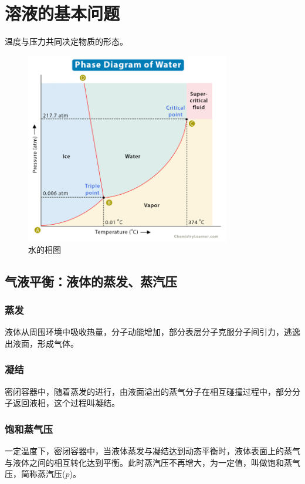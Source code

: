 \documentclass[12pt, a4paper, oneside]{ctexbook}
\begin{document}
\section{溶液的基本问题}
温度与压力共同决定物质的形态。\\
\begin{figure}[htbp]
    \centering
    \includegraphics[width=0.8\textwidth]{pics/phase_diagram.jpg}
    \caption{水的相图}
\end{figure}
\subsection{气液平衡：液体的蒸发、蒸汽压}
\subsubsection{蒸发}
液体从周围环境中吸收热量，分子动能增加，部分表层分子克服分子间引力，逃逸出液面，形成气体。\\
\subsubsection{凝结}
密闭容器中，随着蒸发的进行，由液面溢出的蒸气分子在相互碰撞过程中，部分分子返回液相，这个过程叫凝结。\\
\subsubsection{饱和蒸气压}
一定温度下，密闭容器中，当液体蒸发与凝结达到动态平衡时，液体表面上的蒸气与液体之间的相互转化达到平衡。此时蒸汽压不再增大，为一定值，叫做饱和蒸气压，简称蒸汽压($p$)。\\
\end{document}
